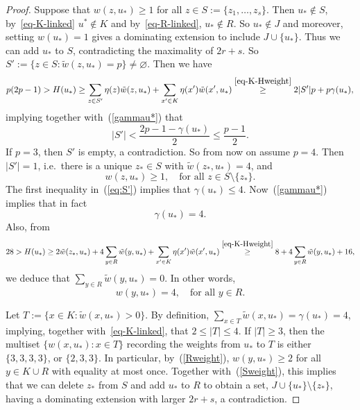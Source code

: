 \documentclass[11pt, a4paper]{article}
\theoremstyle{definition}
\begin{document}
\begin{proof}
	Suppose that $w(z,u_*) \geq 1$ for all $z \in S := \lbrace z_1,\ldots,z_s\rbrace$. Then $u_* \notin S$, by~\eqref{eq-K-linked} $u^* \notin K$ and by~\eqref{eq-R-linked}, $u_* \notin R$.
	So $u_* \notin J$ and moreover, setting $w(u_*)=1$ gives a dominating extension to include $J \cup \{u_*\}$.
	Thus we can add $u_*$ to $S$, contradicting the maximality of $2r+s$.
	So $S' := \{z \in S: \tilde{w}(z,u_*)=p\} \neq \varnothing$.
	Then  we have
	$$p(2p-1)>H(u_*)\ge \sum_{z \in S'}\eta(z)\tilde{w}(z,u_*)+\sum_{x' \in K}\eta(x')\tilde{w}(x',u_*)\stackrel{\eqref{eq-K-Hweight}}{\ge} 2|S'|p+p\gamma(u_*), $$
	implying together with~(\ref{gammau*}) that
	\begin{equation}\label{eq:S'}
		|S'|<\frac{2p-1-\gamma(u_*)}{2} \le \frac{p-1}{2}.
	\end{equation}
	If $p=3$, then $S'$ is empty, a contradiction.
	So from now on assume $p=4$.
	Then $|S'|=1$, i.e.~there is a unique $z_* \in S$ with $\tilde{w}(z_*,u_*)=4$, and 
	\begin{equation}\label{Sweight}
		w(z,u_*)\geq 1,\quad\text{for all }z \in S\setminus\lbrace z_*\rbrace.
	\end{equation}
	The first inequality in~(\ref{eq:S'}) implies that $\gamma(u_*) \leq 4$.
	Now~(\ref{gammau*}) implies that in fact $$\gamma(u_*)=4.$$
	Also, from
	$$
	28 > H(u_*) \geq 2\tilde{w}(z_*,u_*)+ 4\sum_{y \in R}\tilde{w}(y,u_*) +\sum_{x' \in K}\eta(x')\tilde{w}(x',u_*)\stackrel{\eqref{eq-K-Hweight}}{\ge} 8+4\sum_{y \in R}\tilde{w}(y,u_*)+16,
	$$
	we deduce that $\sum_{y \in R}\tilde{w}(y,u_*)=0$. In other words,
	\begin{equation}\label{Rweight}
		w(y,u_*) =4, \quad\text{for all }y \in R.
	\end{equation}
	
	Let $T := \lbrace x \in K: \tilde{w}(x,u_*) > 0\rbrace$. By definition, $ \sum_{x \in T}\tilde{w}(x,u_*)=\gamma(u_*) =4$, implying, together with~\eqref{eq-K-linked}, that $2 \leq |T| \leq 4$.
	If $|T| \geq 3$, then the multiset $\lbrace w(x,u_*) : x \in T\rbrace$ recording the weights from $u_*$ to $T$ is either $ \lbrace 3,3,3,3\rbrace$, or  $\lbrace 2,3,3\rbrace$. In particular, by~(\ref{Rweight}), $w(y,u_*) \geq 2$ for all $y \in K \cup R$ with equality at most once.
	Together with~(\ref{Sweight}), this implies that
	we can delete $z_*$ from $S$ and add $u_*$ to $R$ to obtain a set, $J\cup\{u_*\}\setminus\{z_*\}$, having a dominating extension with larger $2r+s$, a contradiction.
	

\end{proof}
\end{document}
